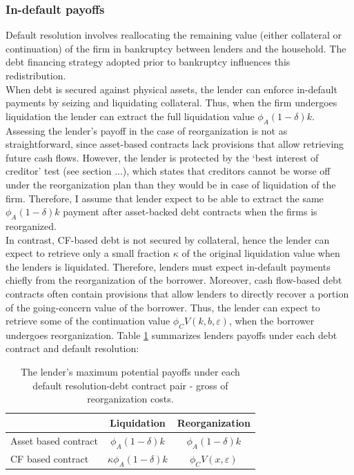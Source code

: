 \documentclass[12pt]{article}
\begin{document}
\subsubsection{In-default payoffs}
Default resolution involves reallocating the remaining value (either collateral or continuation) of the firm in bankruptcy between lenders and the household. The debt financing strategy adopted prior to bankruptcy influences this redistribution.  \vspace{3mm} \\
When debt is secured against physical assets, the lender can enforce in-default payments by seizing and liquidating collateral. Thus, when the firm undergoes liquidation the lender can extract the full liquidation value $\phi_A (1-\delta) k$. Assessing the lender's payoff in the case of reorganization is not as straightforward, since asset-based contracts lack provisions that allow retrieving future cash flows. However, the lender is protected by the `best interest of creditor' test (see section ...), which states that creditors cannot be worse off under the reorganization plan than they would be in case of liquidation of the firm. Therefore, I assume that lender expect to be able to extract the same $\phi_A (1-\delta) k$ payment after asset-backed debt contracts when the firms is reorganized. \vspace{3mm} \\
In contrast, CF-based debt is not secured by collateral, hence the lender can expect to retrieve only a small fraction $\kappa$ of the original liquidation value when the lenders is liquidated. Therefore, lenders must expect in-default payments chiefly from the reorganization of the borrower. Moreover, cash flow-based debt contracts often contain provisions that allow lenders to directly recover a portion of the going-concern value of the borrower. Thus,  the lender can expect to retrieve some of the continuation value $\phi_C V(k,b,\varepsilon)$, when the borrower undergoes reorganization. Table \ref{tab:lender payoffs} summarizes lenders payoffs under each debt contract and default resolution: \\
\begin{table}[h!]
    \centering
    \begin{tabular}{l|cc}
        & Liquidation  & Reorganization \\  
       \midrule
      Asset based contract & $ \phi_A (1-\delta) k$  &  $ \phi_A (1-\delta) k$ \\
      CF based contract & $ \kappa \phi_A (1-\delta) k$ & $ \phi_C V(x,\varepsilon)$ \\ 
     \bottomrule
     \end{tabular}
    \caption{\small The lender's maximum potential payoffs under each default resolution-debt contract pair - gross of reorganization costs.} 
    \label{tab:lender payoffs}
\end{table}
\end{document}

